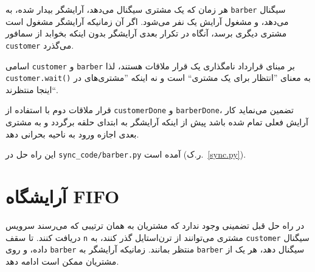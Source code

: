 \documentclass{book}
\newcommand{\clearemptydoublepage}{\newpage\cleardoublepage}
\begin{document}
    هر زمان که  یک مشتری سیگنال می‌دهد، آرایشگر بیدار شده، به  {\tt barber} سیگنال می‌دهد، و مشغول آرایش یک نفر می‌شود. 
    اگر آن زمانیکه آرایشگر مشغول است مشتری دیگری برسد، آنگاه در تکرار بعدی آرایشگر بدون اینکه بخوابد از سمافور {\tt customer} می‌گذرد. 

    اسامی {\tt customer} و {\tt barber} بر مبنای قرارداد نامگذاری یک قرار ملاقات هستند، لذا {\tt customer.wait()} 
    به معنای ''انتظار برای یک مشتری`` است و نه اینکه ''مشتری‌های در اینجا منتظرند``. 

    قرار ملاقات دوم با استفاده از  {\tt customerDone} و {\tt barberDone}، تضمین می‌نماید کار آرایش فعلی تمام شده باشد
    پیش از اینکه آرایشگر به ابتدای حلقه برگردد و به مشتری بعدی اجازه ورود به ناحیه بحرانی دهد. 

    این راه حل در \verb"sync_code/barber.py" آمده است (ر.ک.~\ref{sync.py}).

\clearemptydoublepage
\section{آرایشگاه FIFO}

    در راه حل قبل تضمینی وجود ندارد که مشتریان به همان ترتیبی که می‌رسند سرویس دریافت کنند.
    تا سقف {\tt n} مشتری می‌توانند از ترن‌استایل گذر کنند، به {\tt customer} سیگنال داده، 
    و روی {\tt barber} منتظر بمانند. زمانیکه آرایشگر به {\tt barber} سیگنال دهد، هر یک از 
    مشتریان ممکن است ادامه دهد.
\end{document}
